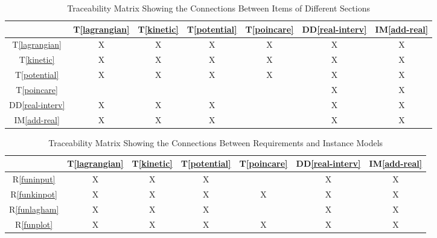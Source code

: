 \documentclass[12pt]{article}
\newcommand{\ddref}[1]{DD\ref{#1}}
\newcommand{\tref}[1]{T\ref{#1}}
\newcommand{\iref}[1]{IM\ref{#1}}
\newcommand{\rref}[1]{R\ref{#1}}
\begin{document}
\begin{table}[H]
	\centering
	\label{Table:trace}
	\begin{tabular}{|c|c|c|c|c|c|c|}
		\hline        
		& \tref{lagrangian}
		& \tref{kinetic}
		& \tref{potential}
		& \tref{poincare}
		& \ddref{real-interv}
		& \iref{add-real} \\
		\hline
        \tref{lagrangian} & X & X & X & X & X & X \\ \hline
        \tref{kinetic} & X & X & X & X & X & X\\ \hline
        \tref{potential} & X & X & X & X & X & X\\ \hline
        \tref{poincare} &  &  &  &  & X & X\\ \hline
        \ddref{real-interv} & X & X & X &  & X & X\\ \hline
        \iref{add-real} & X & X & X &  & X & X\\ \hline
	\end{tabular}
	\caption{Traceability Matrix Showing the Connections Between Items of 
	Different Sections}
\end{table}


\begin{table}[h!]
	\centering
	\begin{tabular}{|c|c|c|c|c|c|c|}
		\hline        
		& \tref{lagrangian}
		& \tref{kinetic}
		& \tref{potential}
		& \tref{poincare}
		& \ddref{real-interv}
		& \iref{add-real} \\
		\hline
        \rref{funinput} & X & X & X &  & X & X \\ \hline
        \rref{funkinpot} & X & X & X & X & X & X\\ \hline
        \rref{funlagham} & X & X & X &  & X & X \\ \hline
        \rref{funplot} & X & X & X & X & X & X\\ \hline
	\end{tabular}
	\caption{Traceability Matrix Showing the Connections Between Requirements 
	and Instance Models}
	\label{Table:R_trace}
\end{table}

\end{document}

